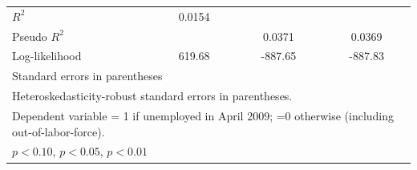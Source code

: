 \begin{table}[htbp]
\begin{tabular}{l*{3}{c}}
$R^2$               &      0.0154         &                     &                     \\
Pseudo $R^2$        &                     &      0.0371         &      0.0369         \\
Log-likelihood      &      619.68         &     -887.65         &     -887.83         \\
\bottomrule
\multicolumn{4}{l}{\footnotesize Standard errors in parentheses}\\
\multicolumn{4}{l}{\footnotesize Heteroskedasticity-robust standard errors in parentheses.}\\
\multicolumn{4}{l}{\footnotesize Dependent variable = 1 if unemployed in April 2009; =0 otherwise (including out-of-labor-force).}\\
\multicolumn{4}{l}{\footnotesize \sym{*} \(p<0.10\), \sym{**} \(p<0.05\), \sym{***} \(p<0.01\)}\\
\end{tabular}
\end{table}
